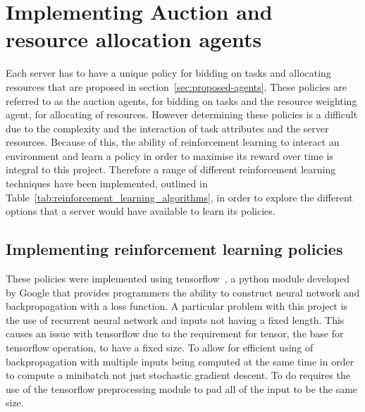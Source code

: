 \section{Implementing Auction and resource allocation agents}\label{sec:implementing-auction-and-resource-allocation-agents}
Each server has to have a unique policy for bidding on tasks and allocating resources that are proposed in
section~\ref{sec:proposed-agents}. These policies are referred to as the auction agents, for bidding on tasks and the
resource weighting agent, for allocating of resources. However determining these policies is a difficult due to the
complexity and the interaction of task attributes and the server resources. Because of this, the ability of
reinforcement learning to interact an environment and learn a policy in order to maximise its reward over time is
integral to this project. Therefore a range of different reinforcement learning techniques have been implemented,
outlined in Table~\ref{tab:reinforcement_learning_algorithms}, in order to explore the different options that a server
would have available to learn its policies.


\subsection{Implementing reinforcement learning policies}\label{subsec:implementing-auction-and-resource-allocation-agents}
These policies were implemented using tensorflow~\cite{tensorflow2015-whitepaper}, a python module developed by Google
that provides programmers the ability to construct neural network and backpropagation with a loss function. A
particular problem with this project is the use of recurrent neural network and inputs not having a fixed length. This
causes an issue with tensorflow due to the requirement for tensor, the base for tensorflow operation, to have a fixed
size. To allow for efficient using of backpropagation with multiple inputs being computed at the same time in order to
compute a minibatch not just stochastic gradient descent. To do requires the use of the tensorflow preprocessing module
to pad all of the input to be the same size.

